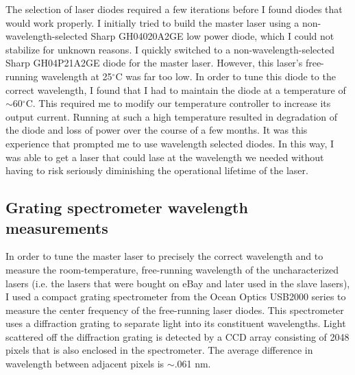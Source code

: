 
The selection of laser diodes required a few iterations before I found diodes that would work properly. I initially tried to build the master laser using a non-wavelength-selected Sharp GH04020A2GE low power diode, which I could not stabilize for unknown reasons. I quickly switched to a non-wavelength-selected Sharp GH04P21A2GE diode for the master laser. However, this laser's free-running wavelength at 25$^\circ$C was far too low. In order to tune this diode to the correct wavelength, I found that I had to maintain the diode at a temperature of $\sim$60$^\circ$C. This required me to modify our temperature controller to increase its output current. Running at such a high temperature resulted in degradation of the diode and loss of power over the course of a few months. It was this experience that prompted me to use wavelength selected diodes. In this way, I was able to get a laser that could lase at the wavelength we needed without having to risk seriously diminishing the operational lifetime of the laser.


\subsection{Grating spectrometer wavelength measurements}
\label{gratingSpectrometerWavelengthMeasurements}
In order to tune the master laser to precisely the correct wavelength and to measure the room-temperature, free-running wavelength of the uncharacterized lasers (i.e. the lasers that were bought on eBay and later used in the slave lasers), I used a compact grating spectrometer from the Ocean Optics USB2000 series to measure the center frequency of the free-running laser diodes. This spectrometer uses a diffraction grating to separate light into its constituent wavelengths. Light scattered off the diffraction grating is detected by a CCD array consisting of 2048 pixels that is also enclosed in the spectrometer. The average difference in wavelength between adjacent pixels is $\sim$.061 nm. %


